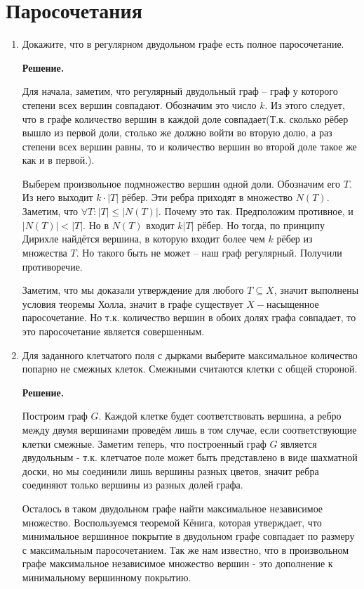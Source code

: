 \section*{Паросочетания}
\begin{enumerate}
	\item Докажите, что в регулярном двудольном графе есть полное паросочетание.
	
	\textbf{Решение.} 
	
	Для начала, заметим, что регулярный двудольный граф -- граф у которого степени всех вершин совпадают. Обозначим 
	это число $k$. Из этого следует, что в графе количество вершин в каждой доле совпадает(Т.к. сколько рёбер вышло 
	из первой доли, столько же должно войти во вторую долю, а раз степени всех вершин равны, то и количество 
	вершин во второй доле такое же как и в первой.).
	
	Выберем произвольное подмножество вершин одной доли. Обозначим его $T$. Из него выходит $k \cdot |T|$ рёбер.
	Эти ребра приходят в множество $N(T)$. Заметим, что $\forall T: |T|\leqslant |N(T)|$. Почему это так. 
	Предположим противное, и $|N(T)| < |T|$. Но в $N(T)$ входит $k \dot |T|$ рёбер. Но тогда, по принципу Дирихле 
	найдётся вершина, в которую входит более чем $k$ рёбер из множества $T$. Но такого быть не может -- наш 
	граф регулярный. Получили противоречие. 
	
	Заметим, что мы доказали утверждение для любого $T \subseteq X$, значит выполнены условия теоремы Холла, 
	значит в графе существует $X-$насыщенное паросочетание. Но т.к. количество вершин в обоих долях графа 
	совпадает, то это паросочетание является совершенным.
	
	\item Для заданного клетчатого поля с дырками выберите максимальное количество попарно не смежных клеток. 
	Смежными считаются клетки с общей стороной.
	
	\textbf{Решение.}
	
	Построим граф $G$. Каждой клетке будет соответствовать вершина, а ребро между двумя вершинами проведём лишь в 
	том случае, если соответствующие клетки смежные. Заметим теперь, что построенный граф $G$ является двудольным 
	- т.к. клетчатое поле может быть представлено в виде шахматной доски, но мы соединили лишь вершины разных 
	цветов, значит ребра соединяют только вершины из разных долей графа.
	
	Осталось в таком двудольном графе найти максимальное независимое множество. Воспользуемся теоремой Кёнига, 
	которая утверждает, что минимальное вершинное покрытие в двудольном графе совпадает по размеру с максимальным 
	паросочетанием. Так же нам известно, что в произвольном графе максимальное независимое множество вершин - это 
	дополнение к минимальному вершинному покрытию.
	

\end{enumerate}
